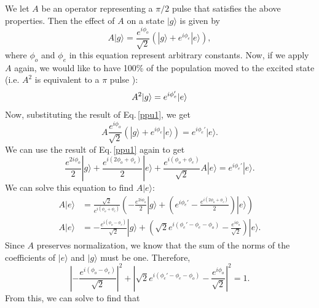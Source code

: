 We let $A$ be an operator representing a $\pi/2$ pulse that satisfies the above properties. Then the effect of $A$ on a state $|g\rangle$ is given by 
\begin{equation} \label{ppu1}
A|g\rangle = \frac{e^{i\phi_o}}{\sqrt{2}} \left(|g\rangle + e^{i\phi_e}|e\rangle\right),
\end{equation}
where $\phi_o$ and $\phi_e$ in this equation represent arbitrary constants.
Now, if we apply $A$ again, we would like to have 100\% of the population moved to the excited state (i.e. $A^2$ is equivalent to a $\pi$ pulse ): 
\begin{equation}
A^2|g\rangle = e^{i\phi_e'}|e\rangle\\
\end{equation}
Now, substituting the result of Eq.\,\eqref{ppu1}, we get
\begin{equation}
A\frac{e^{i\phi_o}}{\sqrt{2}} \left(|g\rangle + e^{i\phi_e}|e\rangle\right)=e^{i\phi_e'}|e\rangle.
\end{equation}
We can use the result of Eq.\,\eqref{ppu1} again to get 
\begin{equation}
\frac{e^{2i\phi_o}}{2}
|g\rangle
+
\frac{e^{i(2\phi_o+\phi_e)}}{2} |e\rangle
+
\frac{e^{i(\phi_o+\phi_e)}}{\sqrt{2}}
A|e\rangle
=e^{i\phi_e'}|e\rangle.
\end{equation}
We can solve this equation to find $A|e\rangle$: 
\begin{align}
A|e\rangle&= 
\frac{\sqrt{2}}{e^{i(\phi_o+\phi_e)}}
\left(
-\frac{e^{2i\phi_o}}{2}|g\rangle
+\left(e^{i\phi_e'}-\frac{e^{i(2\phi_o+\phi_e)}}{2}\right) |e\rangle
\right)\\
A|e\rangle&= 
-\frac{e^{i(\phi_o-\phi_e)}}{\sqrt{2}}|g\rangle
+\left(\sqrt{2}e^{i(\phi_e'-\phi_e-\phi_o)}-\frac{e^{i\phi_o}}{\sqrt{2}}\right) |e\rangle. \label{Aemidddle}
\end{align}
Since $A$ preserves normalization, we know that the sum of the norms of the coefficients of $|e\rangle$ and $|g\rangle$ must be one. Therefore, 
\begin{equation}
\left|-\frac{e^{i(\phi_o-\phi_e)}}{\sqrt{2}}\right|^2 + \left|\sqrt{2}e^{i(\phi_e'-\phi_e-\phi_o)}-\frac{e^{i\phi_o}}{\sqrt{2}}\right|^2 = 1.
\end{equation}
From this, we can solve to find that  
